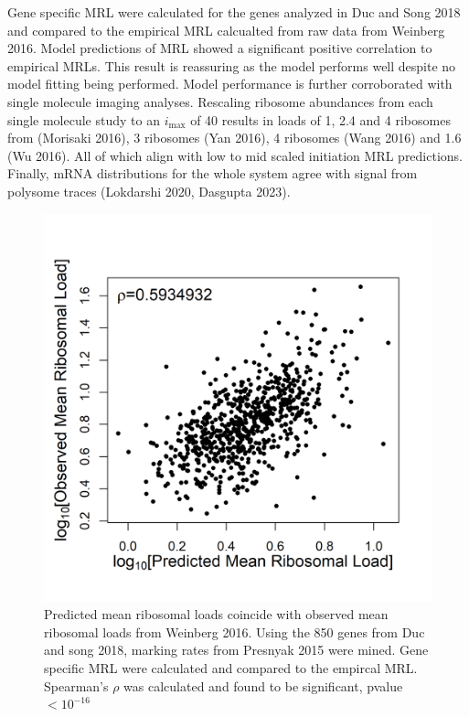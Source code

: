\documentclass[review]{elsarticle}
\newcommand{\imax}{\ensuremath{i_{\max}}\xspace}
\begin{document}
Gene specific MRL were calculated for the genes analyzed in Duc and Song 2018 and compared to the empirical MRL calcualted from raw data from Weinberg 2016. Model predictions of MRL showed a significant positive correlation to empirical MRLs. This result is reassuring as the model performs well despite no model fitting being performed. Model performance is further corroborated with single molecule imaging analyses. Rescaling ribosome abundances from each single molecule study to an \imax of 40 results in loads of 1, 2.4 and 4 ribosomes from (Morisaki 2016), 3 ribosomes (Yan 2016), 4 ribosomes (Wang 2016) and 1.6 (Wu 2016). All of which align with low to mid scaled initiation MRL predictions. Finally, mRNA distributions for the whole system agree with signal from polysome traces (Lokdarshi 2020, Dasgupta 2023).

\begin{figure}[!ht]
\centering
\includegraphics[width=120mm]{Images/Duc_Song_vs_model_log.png}
\caption{Predicted mean ribosomal loads coincide with observed mean ribosomal loads from Weinberg 2016. Using the 850 genes from Duc and song 2018, marking rates from Presnyak 2015 were mined. Gene specific MRL were calculated and compared to the empircal MRL. Spearman's $\rho$ was calculated and found to be significant, pvalue $<10^{-16}$}
\end{figure}
\clearpage 
\end{document}
